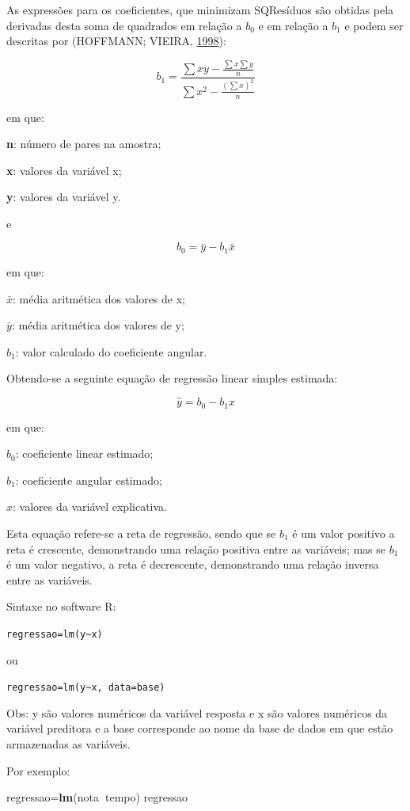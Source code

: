 \documentclass[12pt,brazil,oneside]{book}
\newenvironment{Shaded}{\begin{snugshade}}{\end{snugshade}}
\newcommand{\KeywordTok}[1]{\textcolor[rgb]{0.13,0.29,0.53}{\textbf{#1}}}
\newcommand{\NormalTok}[1]{#1}
\newcommand{\OperatorTok}[1]{\textcolor[rgb]{0.81,0.36,0.00}{\textbf{#1}}}
\begin{document}
As expressões para os coeficientes, que minimizam SQResíduos são obtidas pela derivadas desta soma de quadrados em relação a \(b_0\) e em relação a \(b_1\) e podem ser descritas por (HOFFMANN; VIEIRA, \protect\hyperlink{ref-hoffmann1998}{1998}):

\[
b_1=\frac{\sum xy-\frac{\sum x \sum y}{n}}{\sum x^2 - \frac{(\sum x)^2}{n}}
\]

em que:

\textbf{n}: número de pares na amostra;

\textbf{x}: valores da variável x;

\textbf{y}: valores da variável y.

e

\[
b_0=\bar{y}-b_1\bar{x}
\]

em que:

\(\bar{x}\): média aritmética dos valores de x;

\(\bar{y}\): média aritmética dos valores de y;

\(b_1\): valor calculado do coeficiente angular.

Obtendo-se a seguinte equação de regressão linear simples estimada:

\[
\hat{y}=b_0-b_1{x}
\]

em que:

\(b_0\): coeficiente linear estimado;

\(b_1\): coeficiente angular estimado;

\(x\): valores da variável explicativa.

Esta equação refere-se a reta de regressão, sendo que se \(b_1\) é um valor positivo a reta é crescente, demonstrando uma relação positiva entre as variáveis; mas se \(b_1\) é um valor negativo, a reta é decrescente, demonstrando uma relação inversa entre as variáveis.

Sintaxe no software R:

\texttt{regressao=lm(y\textasciitilde{}x)}

ou

\texttt{regressao=lm(y\textasciitilde{}x,\ data=base)}

Obs: y são valores numéricos da variável resposta e x são valores numéricos da variável preditora e a base corresponde ao nome da base de dados em que estão armazenadas as variáveis.

Por exemplo:

\begin{Shaded}
\begin{Highlighting}[]
\NormalTok{regressao=}\KeywordTok{lm}\NormalTok{(nota}\OperatorTok{~}\NormalTok{tempo)}
\NormalTok{regressao}
\end{Highlighting}
\end{Shaded}
\end{document}
